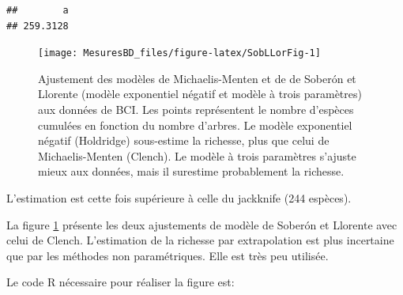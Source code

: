 \documentclass[
  11pt,
  american,
  a4paper,
  extrafontsizes,onecolumn,openright
  ]{memoir}
\begin{document}
\begin{verbatim}
##        a 
## 259.3128
\end{verbatim}

\normalsize



\scriptsize

\begin{figure}

{\centering \texttt{[image: MesuresBD\_files/figure-latex/SobLLorFig-1]} 

}

\caption{Ajustement des modèles de Michaelis-Menten et de de Soberón et Llorente (modèle exponentiel négatif et modèle à trois paramètres) aux données de BCI. Les points représentent le nombre d'espèces cumulées en fonction du nombre d'arbres. Le modèle exponentiel négatif (Holdridge) sous-estime la richesse, plus que celui de Michaelis-Menten (Clench). Le modèle à trois paramètres s'ajuste mieux aux données, mais il surestime probablement la richesse.}\label{fig:SobLLorFig}
\end{figure}

\normalsize

L'estimation est cette fois supérieure à celle du jackknife (244 espèces).

La figure \ref{fig:SobLLorFig} présente les deux ajustements de modèle de Soberón et Llorente avec celui de Clench.
L'estimation de la richesse par extrapolation est plus incertaine que par les méthodes non paramétriques.
Elle est très peu utilisée.

Le code R nécessaire pour réaliser la figure est:

\scriptsize
\end{document}
